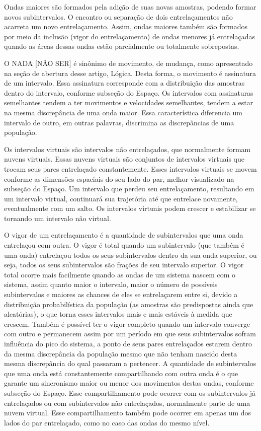 Ondas maiores são formados pela adição de suas novas amostras, podendo formar novos subintervalos. O encontro ou separação de dois entrelaçamentos não acarreta um novo entrelaçamento. Assim, ondas maiores também são formados por meio da inclusão (vigor do entrelaçamento) de ondas menores já entrelaçadas quando as áreas dessas ondas estão parcialmente ou totalmente sobrepostas. 

O NADA [NÃO SER] é sinônimo de movimento, de mudança, como apresentado na seção de abertura desse artigo, Lógica. Desta forma, o movimento é assinatura de um intervalo. Essa assinatura corresponde com a distribuição das amostras dentro do intervalo, conforme subseção do Espaço. Os intervalos com assinaturas semelhantes tendem a ter movimentos e velocidades semelhantes, tendem a estar na mesma discrepância de uma onda maior. Essa característica diferencia um intervalo de outro, em outras palavras, discrimina as discrepâncias de uma população.

Os intervalos virtuais são intervalos não entrelaçados, que normalmente formam nuvens virtuais. Essas nuvens virtuais são conjuntos de intervalos virtuais que trocam seus pares entrelaçado constantemente. Esses intervalos virtuais se movem conforme as dimensões espaciais do seu lado do par, melhor visualizado na subseção do Espaço. Um intervalo que perdeu seu entrelaçamento, resultando em um intervalo virtual, continuará sua trajetória até que entrelace novamente, eventualmente com um salto. Os intervalos virtuais podem crescer e estabilizar se tornando um intervalo não virtual.

O vigor de um entrelaçamento é a quantidade de subintervalos que uma onda entrelaçou com outra. O vigor é total quando um subintervalo (que também é uma onda) entrelaçou todos os seus subintervalos dentro da sua onda superior, ou seja, todos os seus subintervalos são frações de seu intervalo superior. O vigor total ocorre mais facilmente quando as ondas de um sistema nascem com o sistema, assim quanto maior o intervalo, maior o número de possíveis subintervalos e maiores as chances de eles se entrelaçarem entre si, devido a distribuição probabilística da população (as amostras são predispostas ainda que aleatórias), o que torna esses intervalos mais e mais estáveis à medida que crescem. Também é possível ter o vigor completo quando um intervalo converge com outro e permanecem assim por um período em que seus subintervalos sofram influência do pico do sistema, a ponto de seus pares entrelaçados estarem dentro da mesma discrepância da população mesmo que não tenham nascido desta mesma discrepância do qual passaram a pertencer. A quantidade de subintervalos que uma onda está constantemente compartilhando com outra onda é o que garante um sincronismo maior ou menor dos movimentos destas ondas, conforme subseção do Espaço. Esse compartilhamento pode ocorrer com os subintervalos já entrelaçados ou com subintervalos não entrelaçados, normalmente parte de uma nuvem virtual. Esse compartilhamento também pode ocorrer em apenas um dos lados do par entrelaçado, como no caso das ondas do mesmo nível.

